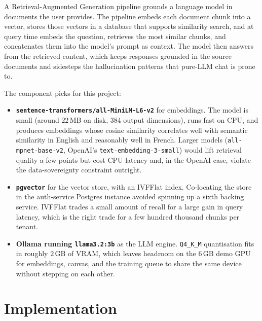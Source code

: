 \documentclass[12pt, a4paper, oneside]{report}
\begin{document}
A Retrieval-Augmented Generation pipeline grounds a language model in
documents the user provides. The pipeline embeds each document chunk
into a vector, stores those vectors in a database that supports
similarity search, and at query time embeds the question, retrieves
the most similar chunks, and concatenates them into the model's
prompt as context. The model then answers from the retrieved
content, which keeps responses grounded in the source documents and
sidesteps the hallucination patterns that pure-LLM chat is prone to.

The component picks for this project:

\begin{itemize}
    \item \textbf{\texttt{sentence-transformers/all-MiniLM-L6-v2}}
        for embeddings. The model is small (around $22$\,MB on
        disk, 384 output dimensions), runs fast on CPU, and produces
        embeddings whose cosine similarity correlates well with
        semantic similarity in English and reasonably well in French.
        Larger models (\texttt{all-mpnet-base-v2}, OpenAI's
        \texttt{text-embedding-3-small}) would lift retrieval quality
        a few points but cost CPU latency and, in the OpenAI case,
        violate the data-sovereignty constraint outright.
    \item \textbf{\texttt{pgvector}} for the vector store, with an
        IVFFlat index. Co-locating the store in the auth-service
        Postgres instance avoided spinning up a sixth backing
        service. IVFFlat trades a small amount of recall for a
        large gain in query latency, which is the right trade for
        a few hundred thousand chunks per tenant.
    \item \textbf{Ollama running \texttt{llama3.2:3b}} as the LLM
        engine. \texttt{Q4\_K\_M} quantisation fits in roughly
        $2$\,GB of VRAM, which leaves headroom on the 6\,GB demo GPU
        for embeddings, canvas, and the training queue to share the
        same device without stepping on each other.
\end{itemize}

\section{Implementation}
\end{document}
